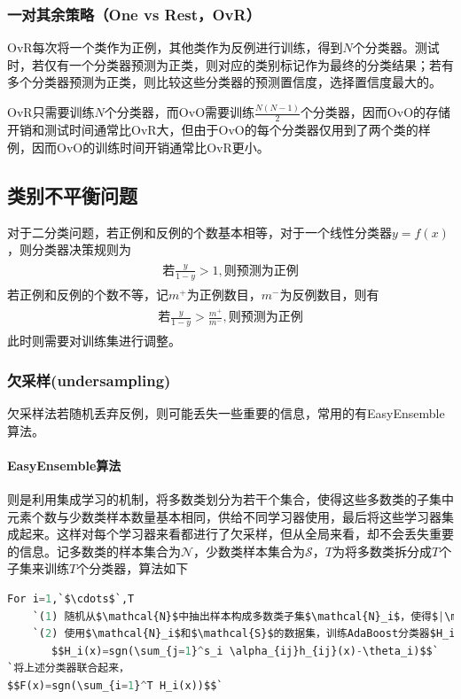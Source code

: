 \subsubsection{一对其余策略（One vs Rest，OvR）}
OvR每次将一个类作为正例，其他类作为反例进行训练，得到$N个$分类器。测试时，若仅有一个分类器预测为正类，则对应的类别标记作为最终的分类结果；若有多个分类器预测为正类，则比较这些分类器的预测置信度，选择置信度最大的。

OvR只需要训练$N$个分类器，而OvO需要训练$\frac{N(N-1)}{2}$个分类器，因而OvO的存储开销和测试时间通常比OvR大，但由于OvO的每个分类器仅用到了两个类的样例，因而OvO的训练时间开销通常比OvR更小。

\subsection{类别不平衡问题}
对于二分类问题，若正例和反例的个数基本相等，对于一个线性分类器$y=f(x)$，则分类器决策规则为
\begin{eqnarray}
\begin{aligned}
\mbox{若}\frac{y}{1-y}>1 , \mbox{则预测为正例}
\end{aligned}
\end{eqnarray}
若正例和反例的个数不等，记$m^+$为正例数目，$m^-$为反例数目，则有
\begin{eqnarray}
\begin{aligned}
\mbox{若}\frac{y}{1-y}>\frac{m^+}{m^-} , \mbox{则预测为正例}
\end{aligned}
\end{eqnarray}
此时则需要对训练集进行调整。
\subsubsection{欠采样(undersampling)}
欠采样法若随机丢弃反例，则可能丢失一些重要的信息，常用的有EasyEnsemble算法。
\paragraph{EasyEnsemble算法}则是利用集成学习的机制，将多数类划分为若干个集合，使得这些多数类的子集中元素个数与少数类样本数量基本相同，供给不同学习器使用，最后将这些学习器集成起来。这样对每个学习器来看都进行了欠采样，但从全局来看，却不会丢失重要的信息。记多数类的样本集合为$\mathcal{N}$，少数类样本集合为$\mathcal{S}$，$T$为将多数类拆分成$T$个子集来训练$T$个分类器，算法如下
\begin{lstlisting}[language=python]
For i=1,`$\cdots$`,T
    `(1) 随机从$\mathcal{N}$中抽出样本构成多数类子集$\mathcal{N}_i$，使得$|\mathcal{N}_i|=|\mathcal{S}|$`
    `(2) 使用$\mathcal{N}_i$和$\mathcal{S}$的数据集，训练AdaBoost分类器$H_i$，其中$h_{ij}(x)$为弱分类器，训练$s_i$次,得到对应的权重$\alpha_{ij}$和阈值$\theta_i$，
       $$H_i(x)=sgn(\sum_{j=1}^s_i \alpha_{ij}h_{ij}(x)-\theta_i)$$`
`将上述分类器联合起来，
$$F(x)=sgn(\sum_{i=1}^T H_i(x))$$`
\end{lstlisting}

